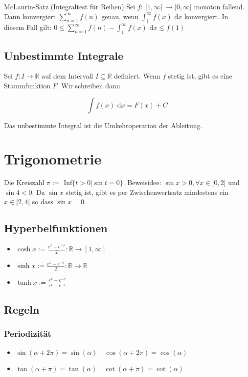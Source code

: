 \documentclass[a4paper,fontsize = 7pt]{scrartcl}
\def\R{\mathbb{R}}
\def\dx{\text{ d}x}
\begin{document}
\begin{subbox}{McLaurin-Satz (Integraltest für Reihen)}
  \vspace{-4pt}
Sei $f: \ [1, \infty[ \ \to [0, \infty[$ monoton fallend. Dann konvergiert $\sum_{n=1}^\infty f(n)$ genau, wenn $\int_1^\infty f(x) \dx$ konvergiert.
In diesem Fall gilt: $0 \leq \sum_{n=1}^\infty f(n) - \int_1^\infty f(x) \dx \leq f(1)$
  \vspace{-4pt}
\end{subbox}

\subsection{Unbestimmte Integrale}
Sei $f: I \to \R$ auf dem Intervall $I \subseteq \R$ definiert. Wenn $f$ stetig ist, gibt es eine Stammfunktion $F$. Wir schreiben dann

$$\int f(x) \dx = F(x) + C$$

Das unbestimmte Integral ist die Umkehroperation der Ableitung.

\section{Trigonometrie}

Die Kreiszahl $\pi :=$ Inf$\{t > 0| \sin t = 0\}$. Beweisidee: $\sin x > 0, \forall x \in ]0, 2]$ und $\sin 4 < 0$. Da $\sin x$ stetig ist, gibt es per Zwischenwertsatz mindestens ein $x \in ]2, 4[$ so dass $\sin x = 0$.
\subsection{Hyperbelfunktionen}
\begin{itemize}
  \item $\cosh x := \frac{e^x + e^{-x}}{2} : \R \to [1, \infty]$
  \item $\sinh x := \frac{e^x - e^{-x}}{2} : \R \to \R$
  \item $\tanh x := \frac{e^x - e^{-x}}{e^x + e^{-x}}$
\end{itemize}

\subsection{Regeln}
\subsubsection{Periodizität}
\begin{itemize}
 \item $\sin(\alpha + 2 \pi) = \sin(\alpha) \quad \cos(\alpha + 2 \pi) = \cos(\alpha)$
 \item $\tan(\alpha + \pi) = \tan(\alpha) \quad \cot(\alpha + \pi) = \cot(\alpha)$
\end{itemize}
\end{document}
